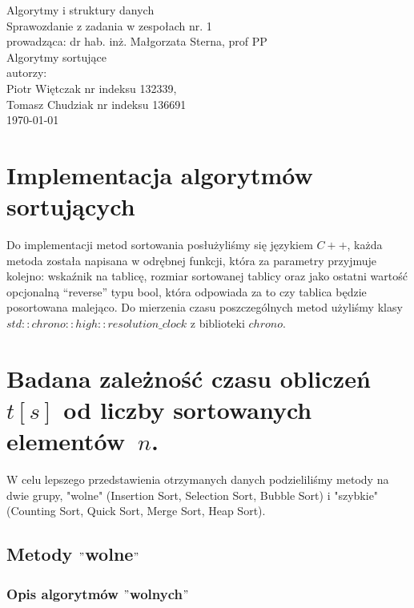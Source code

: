 \documentclass[polish,polish,a4paper]{article}
\begin{document}
	
\begin{spacing}{1.5}
		\begin{titlepage}
		\vspace*{\fill}
		\begin{center}
			{\Large Algorytmy i struktury danych \\[0.1cm]
				Sprawozdanie z zadania w zespołach nr. 1\\[0.1cm]
				prowadząca: dr hab. inż. Małgorzata Sterna, prof PP}\\[0.7cm]
			{\huge Algorytmy sortujące\\ [0.7cm]}
			{\large autorzy:\\[0.1cm]}
			{\Large Piotr Więtczak nr indeksu 132339,\\[0.1cm] Tomasz Chudziak nr indeksu 136691}\\[0.5cm]
			\today
		\end{center}
		\vspace*{\fill}
	\end{titlepage}
	
	\section{Implementacja algorytmów sortujących}
	Do implementacji metod sortowania posłużyliśmy się językiem $ C++ $, każda metoda została napisana  w odrębnej  funkcji, która za parametry przyjmuje kolejno: wskaźnik na tablicę, rozmiar sortowanej tablicy oraz jako ostatni wartość opcjonalną “reverse” typu bool, która odpowiada za to czy tablica będzie posortowana malejąco. Do mierzenia czasu poszczególnych metod użyliśmy klasy $ std::chrono::high::resolution\_clock  $ z biblioteki $ chrono $.
	\section{Badana zależność czasu obliczeń $ t[s]$ od liczby sortowanych elementów~$ n $. }
	W celu lepszego przedstawienia otrzymanych danych podzieliliśmy metody na dwie grupy, "wolne" (Insertion Sort, Selection Sort, Bubble Sort) i "szybkie" (Counting Sort, Quick Sort, Merge Sort, Heap Sort).
	
	\subsection{Metody $ "$wolne$" $}
	\subsubsection{Opis algorytmów $"$wolnych$"$}

\end{spacing}
\end{document}
